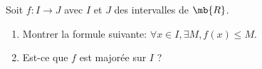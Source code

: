 
Soit $f : I \to J$ avec $I$ et $J$ des intervalles de $\mb{R}$.

\begin{enumerate}
    \item Montrer la formule suivante: $\forall x \in I, \exists M, f(x) \leq
        M$.

    \item Est-ce que $f$ est majorée sur $I$ ?
\end{enumerate}

